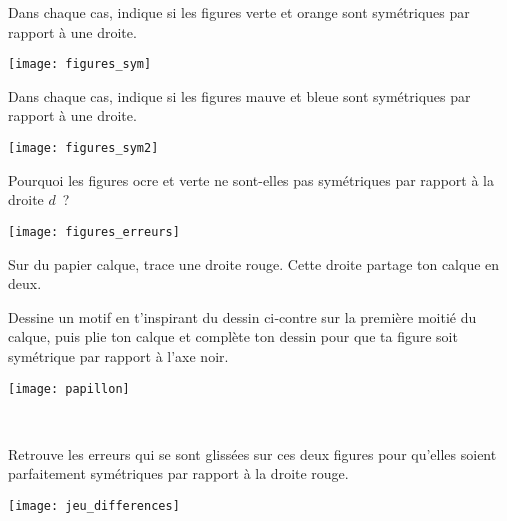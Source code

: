 

\begin{exercice}
Dans chaque cas, indique si les figures verte et orange sont symétriques par rapport à une droite.
\begin{center} \texttt{[image: figures\_sym]} \end{center}
\end{exercice}


\begin{exercice}
Dans chaque cas, indique si les figures mauve et bleue sont symétriques par rapport à une droite.
\begin{center} \texttt{[image: figures\_sym2]} \end{center}
\end{exercice}


\begin{exercice}
Pourquoi les figures ocre et verte ne sont-elles pas symétriques par rapport à la droite $d$ ?
\begin{center} \texttt{[image: figures\_erreurs]} \end{center}
\end{exercice}


\begin{exercice}
\begin{minipage}[c]{0.62\linewidth}
Sur du papier calque, trace une droite rouge. Cette droite partage ton calque en deux.

Dessine un motif en t'inspirant du dessin ci‑contre sur la première moitié du calque, puis plie ton calque et complète ton dessin pour que ta figure soit symétrique par rapport à l'axe noir.
 \end{minipage} \hfill%
 \begin{minipage}[c]{0.36\linewidth}
 \begin{center} \texttt{[image: papillon]} \end{center}
  \end{minipage} \\
\end{exercice}


\begin{exercice}
Retrouve les erreurs qui se sont glissées sur ces deux figures pour qu'elles soient parfaitement symétriques par rapport à la droite rouge.
\begin{center} \texttt{[image: jeu\_differences]} \end{center}
\end{exercice}


